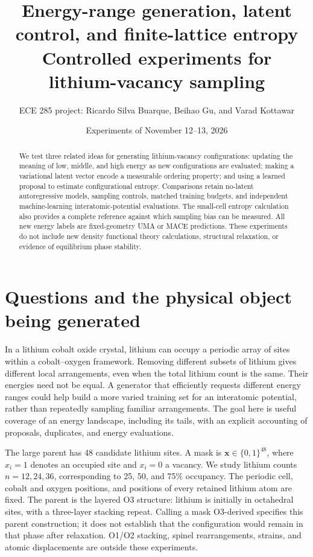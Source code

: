 \documentclass[11pt]{article}
\title{Energy-range generation, latent control, and finite-lattice entropy\\
\large Controlled experiments for lithium-vacancy sampling}
\author{ECE 285 project: Ricardo Silva Buarque, Beihao Gu, and Varad Kottawar}
\date{Experiments of November 12--13, 2026}
\begin{document}
\maketitle

\begin{abstract}
We test three related ideas for generating lithium-vacancy configurations:
updating the meaning of low, middle, and high energy as new configurations are
evaluated; making a variational latent vector encode a measurable ordering
property; and using a learned proposal to estimate configurational entropy.
Comparisons retain no-latent autoregressive models, sampling controls, matched
training budgets, and independent machine-learning interatomic-potential
evaluations. The small-cell entropy calculation also provides a complete
reference against which sampling bias can be measured. All new energy labels
are fixed-geometry UMA or MACE predictions. These experiments do not include
new density functional theory calculations, structural relaxation, or evidence
of equilibrium phase stability.
\end{abstract}

\section{Questions and the physical object being generated}
In a lithium cobalt oxide crystal, lithium can occupy a periodic array of
sites within a cobalt--oxygen framework. Removing different subsets of lithium
gives different local arrangements, even when the total lithium count is the
same. Their energies need not be equal. A generator that efficiently requests
different energy ranges could help build a more varied training set for an
interatomic potential, rather than repeatedly sampling familiar arrangements.
The goal here is useful coverage of an energy landscape, including its tails,
with an explicit accounting of proposals, duplicates, and energy evaluations.

The large parent has 48 candidate lithium sites. A mask is
$\mathbf x\in\{0,1\}^{48}$, where $x_i=1$ denotes an occupied site and $x_i=0$
a vacancy. We study lithium counts $n=12,24,36$, corresponding to 25, 50, and
75\% occupancy. The periodic cell, cobalt and oxygen positions, and positions
of every retained lithium atom are fixed. The parent is the layered O3
structure: lithium is initially in octahedral sites, with a three-layer
stacking repeat. Calling a mask O3-derived specifies this parent construction;
it does not establish that the configuration would remain in that phase after
relaxation. O1/O2 stacking, spinel rearrangements, strains, and atomic
displacements are outside these experiments.
\end{document}
